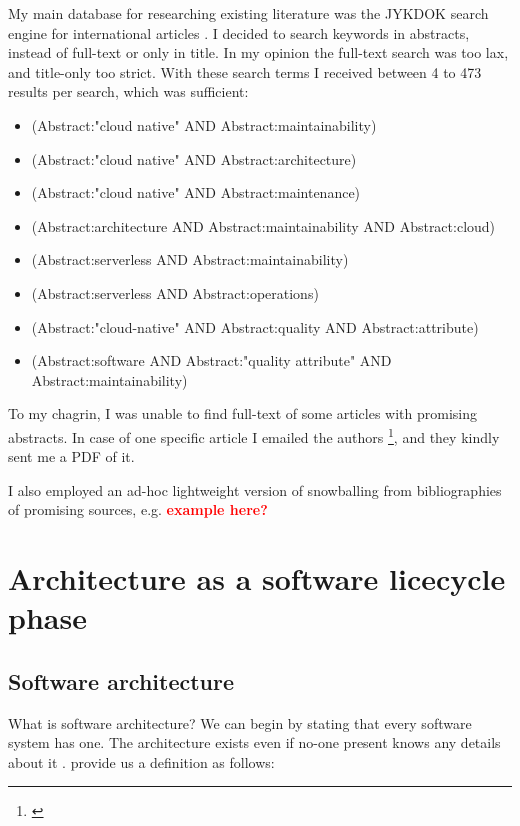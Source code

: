 \documentclass[utf8,english]{gradu3}
\newcommand{\todo}[1]{\textbf{\textcolor{red}{#1}}}
\begin{document}
My main database for researching existing literature was the JYKDOK search engine for international articles \parencite{JYKDOK}.
I decided to search keywords in abstracts, instead of full-text or only in title.
In my opinion the full-text search was too lax, and title-only too strict.
With these search terms I received between 4 to 473 results per search, which was sufficient:
\begin{itemize}
  \item (Abstract:"cloud native" AND Abstract:maintainability)
  \item (Abstract:"cloud native" AND Abstract:architecture)
  \item (Abstract:"cloud native" AND Abstract:maintenance)
  \item (Abstract:architecture AND Abstract:maintainability AND Abstract:cloud)
  \item (Abstract:serverless AND Abstract:maintainability)
  \item (Abstract:serverless AND Abstract:operations)
  \item (Abstract:"cloud-native" AND Abstract:quality AND Abstract:attribute)
  \item (Abstract:software AND Abstract:"quality attribute" AND Abstract:maintainability)
\end{itemize}

To my chagrin, I was unable to find full-text of some articles with promising abstracts.
In case of one specific article I emailed the authors \footnote{\textcite{Bogner2018}}, and they kindly sent me a PDF of it.

I also employed an ad-hoc lightweight version of snowballing from bibliographies of
promising sources, e.g. \todo{example here?}

\section{Architecture as a software licecycle phase}

\subsection{Software architecture}

What is software architecture? We can begin by stating that every software
system has one. The architecture exists even if no-one present knows any details
about it \parencite[24]{Bass1998}. \textcite[23]{Bass1998} provide us a
definition as follows:
\end{document}
